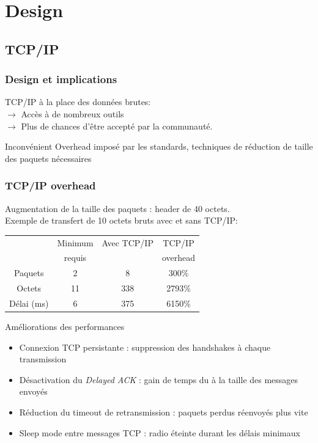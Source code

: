 \section{Design}
\subsection{TCP/IP}
\begin{frame}
 \frametitle{Design et implications}
 TCP/IP à la place des données brutes:\\
 \vspace{5mm}
 \textbf{$\rightarrow$} Accès à de nombreux outils\\
 \textbf{$\rightarrow$} Plus de chances d'être accepté par la communauté.\\
 \vspace{5mm}
\begin{block}{Inconvénient}
Overhead imposé par les standards, techniques de réduction de taille des paquets nécessaires
\end{block}
 
\end{frame}
\begin{frame}
\frametitle{TCP/IP overhead}
Augmentation de la taille des paquets : header de 40 octets.\\
\vspace{5mm}
Exemple de transfert de 10 octets bruts avec et sans TCP/IP: \\
\begin{center}
\begin{tabular}{|c|c|c|c|}
\hline
~ & Minimum & Avec TCP/IP & TCP/IP\\
~ & requis & ~ & overhead\\
\hline
Paquets & 2 & 8 & 300\% \\
Octets & 11 & 338 & 2793\% \\
Délai (ms) & 6 & 375 & 6150\% \\
\hline
\end{tabular}
\end{center}
\end{frame}

\begin{frame}{Améliorations des performances}
\begin{itemize}
\item Connexion TCP persistante : suppression des handshakes à chaque transmission
\item Désactivation du \textit{Delayed ACK} : gain de temps du à la taille des messages envoyés
\item Réduction du timeout de retransmission : paquets perdus réenvoyés plus vite
\item Sleep mode entre messages TCP : radio éteinte durant les délais minimaux
\end{itemize}
\end{frame}

